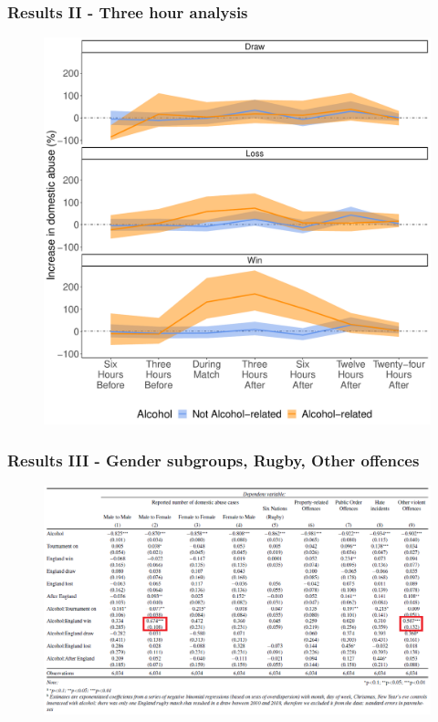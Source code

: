 \documentclass[hyperref={pdfpagelabels=false}]{beamer}
\begin{document}
\begin{frame}
\frametitle{Results II - Three hour analysis}
\begin{center}
\begin{figure}
\includegraphics[scale=0.3]{Threehours.pdf}
\end{figure}
\end{center}
\end{frame}



\begin{frame}
\frametitle{Results III - Gender subgroups, Rugby, Other offences}
\begin{center}
\begin{figure}
\includegraphics[scale=0.5]{result2.png}
\end{figure}
\end{center}
\end{frame}
\end{document}
